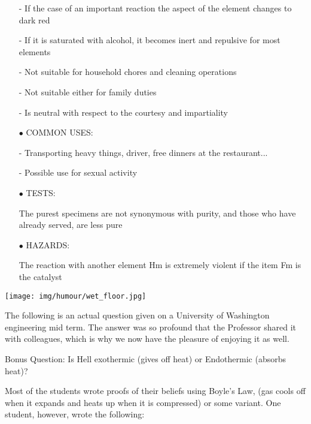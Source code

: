 \begin{itemize}
- If the case of an important reaction the aspect of the element changes to dark red

- If it is saturated with alcohol, it becomes inert and repulsive for most elements

- Not suitable for household chores and cleaning operations 

- Not suitable either for family duties

- Is neutral with respect to the courtesy and impartiality 

	\item[$\bullet$] COMMON USES:

- Transporting heavy things, driver, free dinners at the restaurant...

- Possible use for sexual activity

	\item[$\bullet$] TESTS:

The purest specimens are not synonymous with purity, and those who have already served, are less pure

	\item[$\bullet$] HAZARDS:

The reaction with another element Hm is extremely violent if the item Fm is the catalyst
\end{itemize}

	\begin{center}\underline{\hspace{5 cm}}\end{center}

	\begin{center}
		\texttt{[image: img/humour/wet\_floor.jpg]}	
	\end{center}
	
	\begin{center}\underline{\hspace{5 cm}}\end{center}	
	
	The following is an actual question given on a University of Washington engineering mid term. The answer was so profound that the Professor shared it with colleagues, which is why we now have the pleasure of enjoying it as well.
	
	Bonus Question: Is Hell exothermic (gives off heat) or Endothermic (absorbs heat)?
	
	Most of the students wrote proofs of their beliefs using Boyle's Law, (gas cools off when it expands and heats up when it is compressed) or some variant. One student, however, wrote the following:
	
